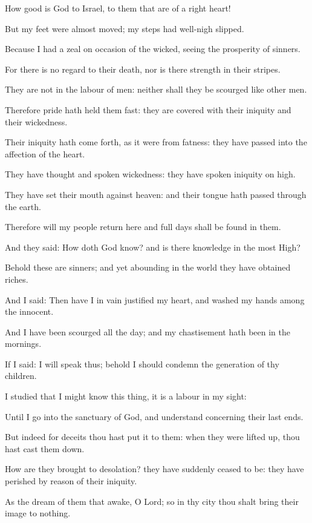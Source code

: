 ﻿\item How good is God to Israel, to them that are of a right heart!
\item But my feet were almost moved; my steps had well-nigh slipped.
\item Because I had a zeal on occasion of the wicked, seeing the prosperity of sinners.
\item For there is no regard to their death, nor is there strength in their stripes.
\item They are not in the labour of men: neither shall they be scourged like other men.
\item Therefore pride hath held them fast: they are covered with their iniquity and their wickedness.
\item Their iniquity hath come forth, as it were from fatness: they have passed into the affection of the heart.
\item They have thought and spoken wickedness: they have spoken iniquity on high.
\item They have set their mouth against heaven: and their tongue hath passed through the earth.
\item Therefore will my people return here and full days shall be found in them.
\item And they said: How doth God know? and is there knowledge in the most High?
\item Behold these are sinners; and yet abounding in the world they have obtained riches.
\item And I said: Then have I in vain justified my heart, and washed my hands among the innocent.
\item And I have been scourged all the day; and my chastisement hath been in the mornings.
\item If I said: I will speak thus; behold I should condemn the generation of thy children.
\item I studied that I might know this thing, it is a labour in my sight:
\item Until I go into the sanctuary of God, and understand concerning their last ends.
\item But indeed for deceits thou hast put it to them: when they were lifted up, thou hast cast them down.
\item How are they brought to desolation? they have suddenly ceased to be: they have perished by reason of their iniquity.
\item As the dream of them that awake, O Lord; so in thy city thou shalt bring their image to nothing.
